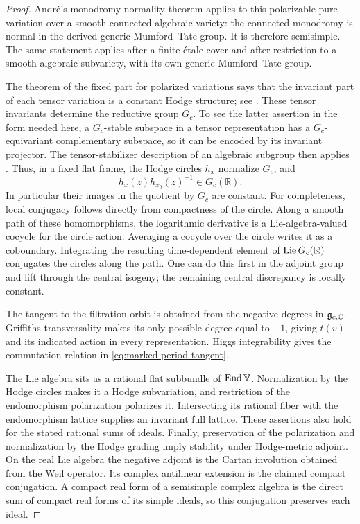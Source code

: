 \begin{proof}
André's monodromy normality theorem
\cite[\S5, Theorem~1]{Andre92} applies to this polarizable pure
variation over a smooth connected algebraic variety: the connected
monodromy is normal in the derived generic Mumford--Tate group.
It is therefore semisimple.  The same statement applies after a
finite étale cover and after restriction to a smooth algebraic
subvariety, with its own generic Mumford--Tate group.

The theorem of the fixed part for polarized variations says that
the invariant part of each tensor variation is a constant Hodge
structure; see \cite[Theorem~7.22 and Corollary~7.23]{Schmid}.
These tensor invariants determine
the reductive group $G_c$.  To see the latter assertion in the form
needed here, a $G_c$-stable subspace in a tensor representation has
a $G_c$-equivariant complementary subspace, so it can be encoded by
its invariant projector.  The tensor-stabilizer description of an
algebraic subgroup then applies
\cite[Theorem~9.2 and \S\S9.6--9.7]{Milne}.  Thus, in a fixed flat frame, the
Hodge circles $h_x$ normalize $G_c$, and
\[
 h_x(z)h_{x_0}(z)^{-1}\in G_c(\mathbb R).
\]
In particular their images in the quotient by $G_c$ are constant.
For completeness, local conjugacy follows directly from compactness
of the circle.  Along a smooth path of these homomorphisms, the
logarithmic derivative is a Lie-algebra-valued cocycle for the
circle action.  Averaging a cocycle over the circle writes it as a
coboundary.  Integrating the resulting time-dependent element of
$\operatorname{Lie} G_c(\mathbb R)$ conjugates the circles along the path.  One
can do this first in the adjoint group and lift through the central
isogeny; the remaining central discrepancy is locally constant.

The tangent to the filtration orbit is obtained from the negative
degrees in $\mathfrak g_{c,\mathbb C}$.  Griffiths transversality makes its
only possible degree equal to $-1$, giving $t(v)$ and its indicated
action in every representation.  Higgs integrability gives the
commutation relation in \eqref{eq:marked-period-tangent}.

The Lie algebra sits as a rational flat subbundle of
$\operatorname{End}\mathbb V$.  Normalization by the Hodge circles makes it a
Hodge subvariation, and restriction of the endomorphism polarization
polarizes it.  Intersecting its rational fiber with the endomorphism
lattice supplies an invariant full lattice.  These assertions also
hold for the stated rational sums of ideals.  Finally, preservation
of the polarization and normalization by the Hodge grading imply
stability under Hodge-metric adjoint.  On the real Lie algebra the
negative adjoint is the Cartan involution obtained from the Weil
operator.  Its complex antilinear extension is the claimed compact
conjugation.  A compact real form of a semisimple complex algebra
is the direct sum of compact real forms of its simple ideals, so
this conjugation preserves each ideal.
\end{proof}

